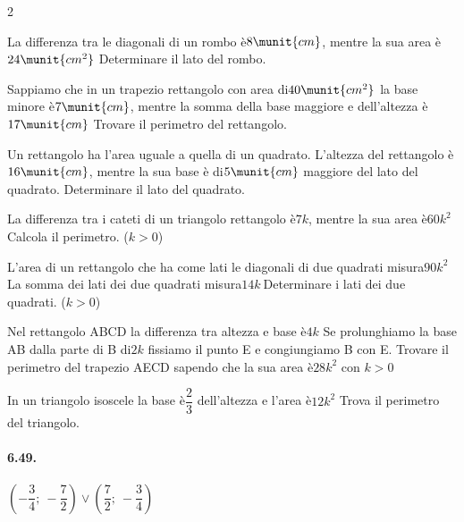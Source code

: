 \begin{htmulticols}{2}
\begin{esercizio}[*]
\label{ese:6.65}
La differenza tra le diagonali di un rombo è\(8\munit{cm}\), mentre la sua 
area è 
\(24\munit{{cm}^2}~\)Determinare il lato del rombo.
\end{esercizio}

\begin{esercizio}[*]
\label{ese:6.66}
Sappiamo che in un trapezio rettangolo con area di\(40\munit{{cm}^2}\) la 
base 
minore è\(7\munit{cm}\), mentre la somma della base maggiore e 
dell'altezza 
è 
\(17\munit{cm}\) Trovare il perimetro del rettangolo.
\end{esercizio}

\begin{esercizio}[*]
\label{ese:6.67}
Un rettangolo ha l'area uguale a quella di un quadrato. L'altezza del 
rettangolo 
è\(16\munit{cm}\), mentre la sua base è di\(5\munit{cm}\) maggiore del lato 
del 
quadrato. Determinare il lato del quadrato.
\end{esercizio}

\begin{esercizio}[*]
\label{ese:6.68}
La differenza tra i cateti di un triangolo rettangolo è\(7k\), mentre la 
sua 
area 
è\(60 k^2~\)Calcola il perimetro. (\(k>0\))
\end{esercizio}

\begin{esercizio}[*]
\label{ese:6.69}
L'area di un rettangolo che ha come lati le diagonali di due quadrati 
misura\(90 
k^2\) La somma dei lati dei due quadrati misura\(14k~\)Determinare i lati 
dei 
due 
quadrati. (\( k>0\))
\end{esercizio}

\begin{esercizio}[*]
\label{ese:6.70}
Nel rettangolo ABCD la differenza tra altezza e base è\(4k\) Se 
prolunghiamo 
la 
base AB dalla parte di B di\(2k\) fissiamo il punto E e congiungiamo B 
con 
E. 
Trovare il perimetro del trapezio AECD sapendo che la sua area è\(28k^2\) 
con 
\(k>0\)
\end{esercizio}

\begin{esercizio}[*]
\label{ese:6.71}
In un triangolo isoscele la base è\( \dfrac 2 3\) dell'altezza e l'area 
è\(12k^2\) 
Trova il perimetro del triangolo.
\end{esercizio}
\end{htmulticols}

\paragraph{6.49.}\(\left(-\dfrac 3 4;~-\dfrac 7 2\right)\vee \left(\dfrac 
7 
2;~-\dfrac 
3 4\right)\)
